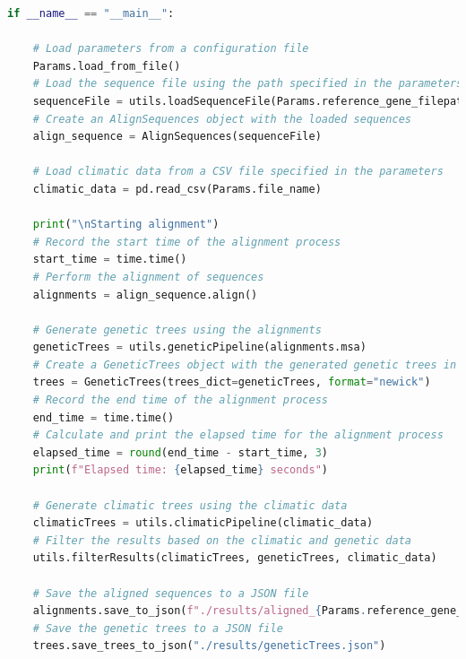 \begin{lstlisting}[label=lst:main,language=Python,caption=Main script for tutorial using the aPhyloGeo package.]
if __name__ == "__main__":

    # Load parameters from a configuration file
    Params.load_from_file()
    # Load the sequence file using the path specified in the parameters
    sequenceFile = utils.loadSequenceFile(Params.reference_gene_filepath)
    # Create an AlignSequences object with the loaded sequences
    align_sequence = AlignSequences(sequenceFile)

    # Load climatic data from a CSV file specified in the parameters
    climatic_data = pd.read_csv(Params.file_name)

    print("\nStarting alignment")
    # Record the start time of the alignment process
    start_time = time.time()
    # Perform the alignment of sequences
    alignments = align_sequence.align()

    # Generate genetic trees using the alignments
    geneticTrees = utils.geneticPipeline(alignments.msa)
    # Create a GeneticTrees object with the generated genetic trees in Newick format
    trees = GeneticTrees(trees_dict=geneticTrees, format="newick")
    # Record the end time of the alignment process
    end_time = time.time()
    # Calculate and print the elapsed time for the alignment process
    elapsed_time = round(end_time - start_time, 3)
    print(f"Elapsed time: {elapsed_time} seconds")

    # Generate climatic trees using the climatic data
    climaticTrees = utils.climaticPipeline(climatic_data)
    # Filter the results based on the climatic and genetic data
    utils.filterResults(climaticTrees, geneticTrees, climatic_data)

    # Save the aligned sequences to a JSON file
    alignments.save_to_json(f"./results/aligned_{Params.reference_gene_file}.json")
    # Save the genetic trees to a JSON file
    trees.save_trees_to_json("./results/geneticTrees.json")
\end{lstlisting}

